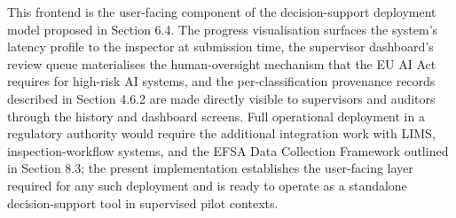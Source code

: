 This frontend is the user-facing component of the decision-support deployment model proposed in Section 6.4. The progress visualisation surfaces the system's latency profile to the inspector at submission time, the supervisor dashboard's review queue materialises the human-oversight mechanism that the EU AI Act requires for high-risk AI systems, and the per-classification provenance records described in Section 4.6.2 are made directly visible to supervisors and auditors through the history and dashboard screens. Full operational deployment in a regulatory authority would require the additional integration work with LIMS, inspection-workflow systems, and the EFSA Data Collection Framework outlined in Section 8.3; the present implementation establishes the user-facing layer required for any such deployment and is ready to operate as a standalone decision-support tool in supervised pilot contexts.
